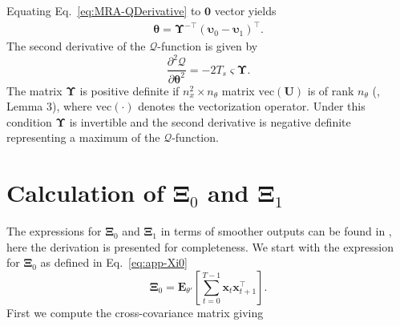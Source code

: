 \documentclass[review,authoryear,3p]{elsarticle}
\begin{document}
Equating Eq.~\eqref{eq:MRA-QDerivative} to $\mathbf 0$ vector yields
\begin{align}\label{eq:app-thetahat}
\boldsymbol \theta= \boldsymbol\Upsilon^{-\top}(\boldsymbol\upsilon_0-\boldsymbol\upsilon_1)^\top.
\end{align}
The second derivative of the $\mathcal Q$-function is given by
\begin{equation}
\frac{\partial^2\mathcal Q}{\partial\boldsymbol\theta^2}=-2T_s\varsigma\boldsymbol\Upsilon.
\end{equation}
The matrix $\boldsymbol\Upsilon$ is positive definite if $n_x^2\times n_{\theta}$ matrix $\mathrm{vec}(\mathbf U)$ is of rank $n_{\theta}$ (\citep{Dewar2009}, Lemma 3), where $\mathrm{vec}(\cdot)$ denotes the vectorization operator. Under this condition $\boldsymbol\Upsilon$ is  invertible and the second derivative is negative definite representing a maximum of the $\mathcal Q$-function.  
\section{Calculation of $\boldsymbol\Xi_{0}$ and $\boldsymbol\Xi_{1}$}\label{ap:Xiderivation}
The expressions for $\boldsymbol\Xi_{0}$ and $\boldsymbol\Xi_{1}$ in terms of smoother outputs can be found in \cite{Shumway2000}, here the derivation is presented for completeness.  We start with the expression for  $\boldsymbol\Xi_{0}$ as defined in Eq.~\eqref{eq:app-Xi0} 
   \begin{equation}\label{eq:appXi0}
	 \boldsymbol\Xi_0=\mathbf E_{\theta'}\left[\sum_{t=0}^{T-1}\mathbf x_t\mathbf x_{t+1}^\top\right].
	\end{equation}                                                                                                
	First we compute the cross-covariance matrix giving
	
\end{document}
